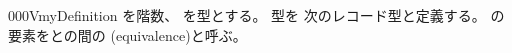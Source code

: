 \documentclass[index]{subfiles}
\begin{document}
\begin{myBlock}{000V}{myDefinition}
  を階数、
  を型とする。
  型を
  次のレコード型と定義する。
  の要素をとの間の
  (equivalence)と呼ぶ。
\end{myBlock}
\end{document}
